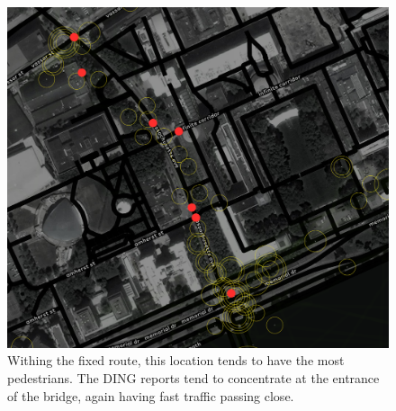 \begin{figure}[!htb]
  \includegraphics{appendix/B/fig/overlap_mass_avenue.png}               
  \caption[`bad' reports close to the entrance of MIT]{Withing the fixed route, this location tends to have the most pedestrians. The DING reports tend to concentrate at the entrance of the bridge, again having fast traffic passing close.}
  \label{fig:bad_mass}
\end{figure}

